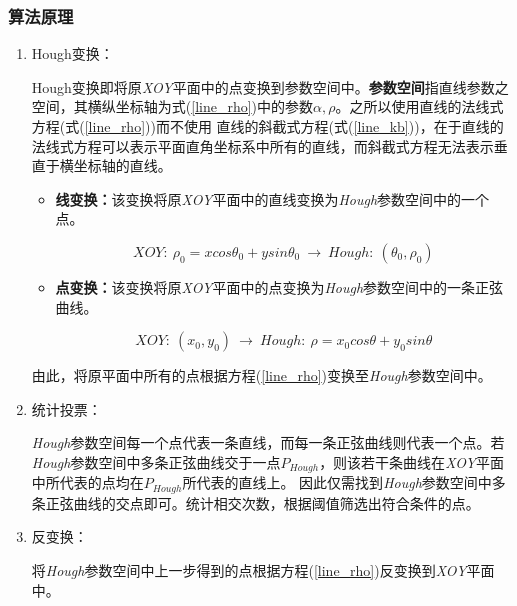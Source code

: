     \subsubsection{算法原理}
        \begin{enumerate}
            \item Hough变换：
            
            \hspace{20pt}Hough变换即将原\textit{XOY}平面中的点变换到参数空间中。\textbf{参数空间}指直线参数之空间，其横纵坐标轴为式(\ref{line_rho})中的参数$\alpha, \rho$。之所以使用直线的法线式方程(式(\ref{line_rho}))而不使用
                            直线的斜截式方程(式(\ref{line_kb}))，在于直线的法线式方程可以表示平面直角坐标系中所有的直线，而斜截式方程无法表示垂直于横坐标轴的直线。
                \begin{itemize}
                    \item \textbf{线变换：}该变换将原\textit{XOY}平面中的直线变换为\textit{Hough}参数空间中的一个点。

                        \begin{equation}
                            XOY: \ \rho_0 = x cos\theta_0+y sin\theta_0 \ \rightarrow \ Hough: \ (\theta_0,\rho_0)
                        \end{equation}
                    \item \textbf{点变换：}该变换将原\textit{XOY}平面中的点变换为\textit{Hough}参数空间中的一条正弦曲线。
                    
                    \begin{equation}
                        XOY: \ (x_0,y_0) \ \rightarrow \ Hough: \ \rho = x_0 cos\theta+y_0 sin\theta
                    \end{equation}
                    
                \end{itemize}

            \hspace{20pt}由此，将原平面中所有的点根据方程(\ref{line_rho})变换至\textit{Hough}参数空间中。

            \item 统计投票：
            
            \hspace{20pt} \textit{Hough}参数空间每一个点代表一条直线，而每一条正弦曲线则代表一个点。若\textit{Hough}参数空间中多条正弦曲线交于一点$P_{Hough}$，则该若干条曲线在\textit{XOY}平面中所代表的点均在$P_{Hough}$所代表的直线上。
            因此仅需找到\textit{Hough}参数空间中多条正弦曲线的交点即可。统计相交次数，根据阈值筛选出符合条件的点。
                        
            \item 反变换：
            
            \hspace{20pt}将\textit{Hough}参数空间中上一步得到的点根据方程(\ref{line_rho})反变换到\textit{XOY}平面中。

        \end{enumerate}

